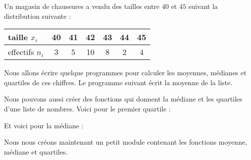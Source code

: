     Un magasin de chaussures a vendu des tailles entre \( 40\) et \( 45\) suivant la distribution suivante :
    \begin{center}
        \begin{tabular}{|l||c|c|c|c|c|c|}
            \hline
            taille \( x_i\)&40&41&42&43&44&45\\
            \hline
            effectifs \( n_i\)&3&5&10&8&2&4\\
            \hline
        \end{tabular}
    \end{center}

    Nous allons écrire quelque programmes pour calculer les moyennes, médianes et quartiles de ces chiffres. Le programme suivant écrit la moyenne de la liste.

    



Nous pouvons aussi créer des fonctions qui donnent la médiane et les quartiles d'une liste de nombres. Voici pour le premier quartile :



Et voici pour la médiane :



Nous nous créons maintenant un petit module contenant les fonctions moyenne, médiane et quartiles.

